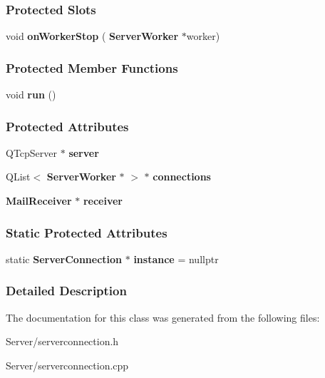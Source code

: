 \subsubsection*{Protected Slots}
\begin{DoxyCompactItemize}
\item 
\mbox{\label{a00238_af558fe509b60eb019281316513f6d188}} 
void {\bfseries on\+Worker\+Stop} (\textbf{ Server\+Worker} $\ast$worker)
\end{DoxyCompactItemize}
\subsubsection*{Protected Member Functions}
\begin{DoxyCompactItemize}
\item 
\mbox{\label{a00238_ac7f219a30789e91afa079ab5e49529bd}} 
void {\bfseries run} ()
\end{DoxyCompactItemize}
\subsubsection*{Protected Attributes}
\begin{DoxyCompactItemize}
\item 
\mbox{\label{a00238_aee9a8e6c0f1d25fc2fcb4662631c0c74}} 
Q\+Tcp\+Server $\ast$ {\bfseries server}
\item 
\mbox{\label{a00238_a7d9e1b1ac7c2d57b439ab5918e7c31d0}} 
Q\+List$<$ \textbf{ Server\+Worker} $\ast$ $>$ $\ast$ {\bfseries connections}
\item 
\mbox{\label{a00162_aa57ce2f74f8ad76abb38974f85b97ac5}} 
\textbf{ Mail\+Receiver} $\ast$ {\bfseries receiver}
\end{DoxyCompactItemize}
\subsubsection*{Static Protected Attributes}
\begin{DoxyCompactItemize}
\item 
\mbox{\label{a00238_adbbe8ffe6ee71b0aee4db9b6e689ba2a}} 
static \textbf{ Server\+Connection} $\ast$ {\bfseries instance} = nullptr
\end{DoxyCompactItemize}


\subsubsection{Detailed Description}


The documentation for this class was generated from the following files\+:\begin{DoxyCompactItemize}
\item 
Server/serverconnection.\+h\item 
Server/serverconnection.\+cpp\end{DoxyCompactItemize}
